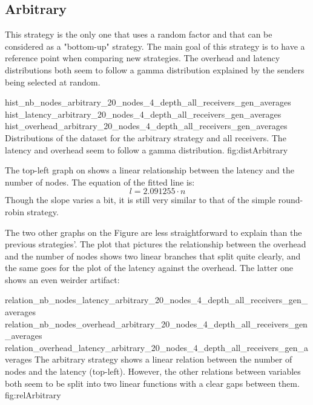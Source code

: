 \FloatBarrier
\subsection{Arbitrary}
\label{ssec:arbitrary}
This strategy is the only one that uses a random factor and that can be
considered as a "bottom-up" strategy. The main goal of this strategy is to
have a reference point when comparing new strategies.
The overhead and latency distributions both seem to follow a gamma distribution
explained by the senders being selected at random.

\triplefigure
    {hist_nb_nodes_arbitrary_20_nodes_4_depth_all_receivers_gen_averages}
    {hist_latency_arbitrary_20_nodes_4_depth_all_receivers_gen_averages}
    {hist_overhead_arbitrary_20_nodes_4_depth_all_receivers_gen_averages}
    {Distributions of the dataset for the arbitrary strategy and all
    receivers. The latency and overhead seem to follow a gamma distribution. }
    {fig:distArbitrary}

The top-left graph on  shows a linear relationship
between the latency and the number of nodes. The equation of the fitted line is:
\[l = 2.091255 \cdot n\]
Though the slope varies a bit, it is still very similar to that of the simple
round-robin strategy.

The two other graphs on the Figure are less straightforward to explain than the
previous strategies'. The plot that pictures the relationship between the
overhead and the number of nodes shows two linear branches that split quite
clearly, and the same goes for the plot of the latency against the overhead.
The latter one shows an even weirder artifact: 

\triplefigure
    {relation_nb_nodes_latency_arbitrary_20_nodes_4_depth_all_receivers_gen_averages}
    {relation_nb_nodes_overhead_arbitrary_20_nodes_4_depth_all_receivers_gen_averages}
    {relation_overhead_latency_arbitrary_20_nodes_4_depth_all_receivers_gen_averages}
    {The arbitrary strategy shows a linear relation between the number of
    nodes and the latency (top-left). However, the other relations between
    variables both seem to be split into two linear functions with a clear gaps
    between them.}
    {fig:relArbitrary}

